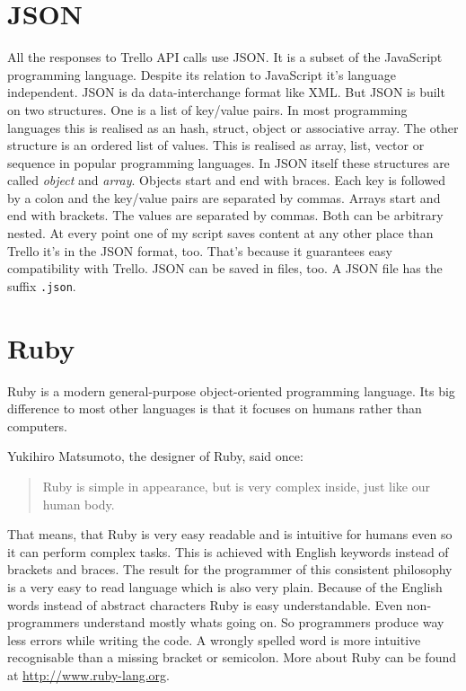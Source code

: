 \section{JSON}
All the responses to Trello API calls use JSON. It is a subset of the JavaScript programming language. Despite its relation to JavaScript it's language independent. JSON is da data-interchange format like XML. But JSON is built on two structures. One is a list of key/value pairs. In most programming languages this is realised as an hash, struct, object or associative array. The other structure is an ordered list of values. This is realised as array, list, vector or sequence in popular programming languages. In JSON itself these structures are called \emph{object} and \emph{array}. Objects start and end with braces. Each key is followed by a colon and the key/value pairs are separated by commas. Arrays start and end with brackets. The values are separated by commas. Both can be arbitrary nested. At every point one of my script saves content at any other place than Trello it's in the JSON format, too. That's because it guarantees easy compatibility with Trello. JSON can be saved in files, too. A JSON file has the suffix \texttt{.json}. \cite{json}

\section{Ruby}
Ruby is a modern general-purpose object-oriented programming language. Its big difference to most other languages is that it focuses on humans rather than computers. 

Yukihiro Matsumoto, the designer of Ruby, said once:
\begin{quote}
Ruby is simple in appearance, but is very
complex inside, just like our human body.\cite{ruby:talk}
\end{quote}

That means, that Ruby is very easy readable and is intuitive for humans even so it can perform complex tasks. This is achieved with English keywords instead of brackets and braces. The result for the programmer of this consistent philosophy is a very easy to read language which is also very plain. Because of the English words instead of abstract characters Ruby is easy understandable. Even non-programmers understand mostly whats going on. So programmers produce way less errors while writing the code. A wrongly spelled word is more intuitive recognisable than a missing bracket or semicolon. \cite{ruby:about} More about Ruby can be found at \url{http://www.ruby-lang.org}.

